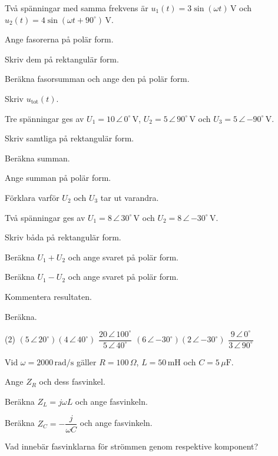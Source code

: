 Två spänningar med samma frekvens är $u_1(t) = 3\sin(\omega t)\,\text{V}$ och
$u_2(t) = 4\sin(\omega t + 90^{\circ})\,\text{V}$.
\begin{parts}
  \item Ange fasorerna på polär form.
  \item Skriv dem på rektangulär form.
  \item Beräkna fasorsumman och ange den på polär form.
  \item Skriv $u_{\text{tot}}(t)$.
\end{parts}

Tre spänningar ges av $U_1 = 10\,\angle\,0^{\circ}\,\text{V}$,
$U_2 = 5\,\angle\,90^{\circ}\,\text{V}$ och $U_3 = 5\,\angle\,{-90^{\circ}}\,\text{V}$.
\begin{parts}
  \item Skriv samtliga på rektangulär form.
  \item Beräkna summan.
  \item Ange summan på polär form.
  \item Förklara varför $U_2$ och $U_3$ tar ut varandra.
\end{parts}

Två spänningar ges av $U_1 = 8\,\angle\,30^{\circ}\,\text{V}$ och
$U_2 = 8\,\angle\,{-30^{\circ}}\,\text{V}$.
\begin{parts}
  \item Skriv båda på rektangulär form.
  \item Beräkna $U_1 + U_2$ och ange svaret på polär form.
  \item Beräkna $U_1 - U_2$ och ange svaret på polär form.
  \item Kommentera resultaten.
\end{parts}

Beräkna.
\begin{delar}(2)
  \task $(5\,\angle\,20^{\circ})(4\,\angle\,40^{\circ})$
  \task $\dfrac{20\,\angle\,100^{\circ}}{5\,\angle\,40^{\circ}}$
  \task $(6\,\angle\,{-30^{\circ}})(2\,\angle\,{-30^{\circ}})$
  \task $\dfrac{9\,\angle\,0^{\circ}}{3\,\angle\,90^{\circ}}$
\end{delar}

Vid $\omega = 2000\,\text{rad/s}$ gäller $R = 100\,\Omega$, $L = 50\,\text{mH}$ och
$C = 5\,\mu\text{F}$.
\begin{parts}
  \item Ange $Z_R$ och dess fasvinkel.
  \item Beräkna $Z_L = j\omega L$ och ange fasvinkeln.
  \item Beräkna $Z_C = -\dfrac{j}{\omega C}$ och ange fasvinkeln.
  \item Vad innebär fasvinklarna för strömmen genom respektive komponent?
\end{parts}

